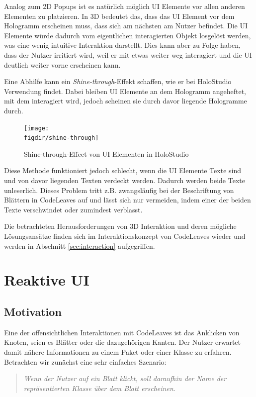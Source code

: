 Analog zum 2D Popups ist es natürlich möglich UI Elemente vor allen anderen Elementen zu platzieren. In 3D bedeutet das, dass das UI Element vor dem Hologramm erscheinen muss, dass sich am nächsten am Nutzer befindet. Die UI Elemente würde dadurch vom eigentlichen interagierten Objekt losgelöst werden, was eine wenig intuitive Interaktion darstellt. Dies kann aber zu Folge haben, dass der Nutzer irritiert wird, weil er mit etwas weiter weg interagiert und die UI deutlich weiter vorne erscheinen kann.

Eine Abhilfe kann ein \textit{Shine-through}-Effekt schaffen, wie er bei HoloStudio Verwendung findet. Dabei bleiben UI Elemente an dem Hologramm angeheftet, mit dem interagiert wird, jedoch scheinen sie durch davor liegende Hologramme durch.

\begin{figure}[htb]
  \texttt{[image: \\figdir/shine-through]}
  \caption{Shine-through-Effect von UI Elementen in HoloStudio \cite{windows2017casestudy3}}
  \label{fig:shine-through}
\end{figure}

Diese Methode funktioniert jedoch schlecht, wenn die UI Elemente Texte sind und von davor liegenden Texten verdeckt werden. Dadurch werden beide Texte unleserlich. Dieses Problem tritt z.B. zwangsläufig bei der Beschriftung von Blättern in CodeLeaves auf und lässt sich nur vermeiden, indem einer der beiden Texte verschwindet oder zumindest verblasst.

Die betrachteten Herausforderungen von 3D Interaktion und deren mögliche Lösungsansätze finden sich im Interaktionskonzept von CodeLeaves wieder und werden in Abschnitt \ref{sec:interaction} aufgegriffen.

\section{Reaktive UI}

\subsection{Motivation}
Eine der offensichtlichen Interaktionen mit CodeLeaves ist das Anklicken von Knoten, seien es Blätter oder die dazugehörigen Kanten. Der Nutzer erwartet damit nähere Informationen zu einem Paket oder einer Klasse zu erfahren. Betrachten wir zunächst eine sehr einfaches Szenario:

\begin{quotation}
  \textit{Wenn der Nutzer auf ein Blatt klickt, soll daraufhin der Name der repräsentierten Klasse über dem Blatt erscheinen.}
\end{quotation}

